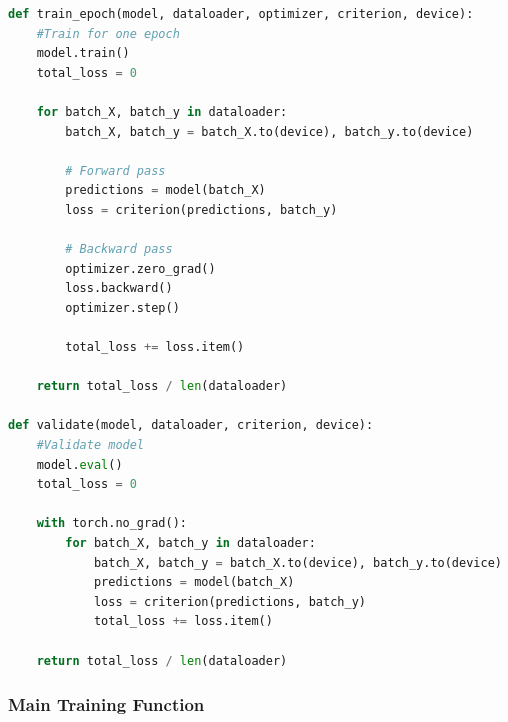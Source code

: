 \documentclass[12pt,a4paper]{report}
\begin{document}
\begin{lstlisting}[language=Python, caption={Training Loop Structure}]
def train_epoch(model, dataloader, optimizer, criterion, device):
    #Train for one epoch
    model.train()
    total_loss = 0
    
    for batch_X, batch_y in dataloader:
        batch_X, batch_y = batch_X.to(device), batch_y.to(device)
        
        # Forward pass
        predictions = model(batch_X)
        loss = criterion(predictions, batch_y)
        
        # Backward pass
        optimizer.zero_grad()
        loss.backward()
        optimizer.step()
        
        total_loss += loss.item()
    
    return total_loss / len(dataloader)

def validate(model, dataloader, criterion, device):
    #Validate model
    model.eval()
    total_loss = 0
    
    with torch.no_grad():
        for batch_X, batch_y in dataloader:
            batch_X, batch_y = batch_X.to(device), batch_y.to(device)
            predictions = model(batch_X)
            loss = criterion(predictions, batch_y)
            total_loss += loss.item()
    
    return total_loss / len(dataloader)
\end{lstlisting}

\subsubsection{Main Training Function}
\end{document}

